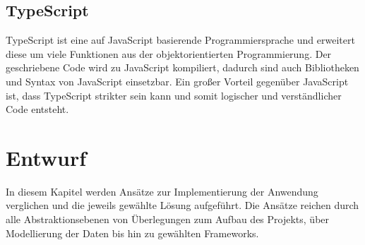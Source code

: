 \documentclass[12pt,twoside,a4paper]{article}
\begin{document}
\begin{sloppypar}
\subsection{TypeScript}\label{sec:typescript}
TypeScript ist eine auf JavaScript basierende Programmiersprache und erweitert diese um viele Funktionen aus der objektorientierten Programmierung. Der geschriebene Code wird zu JavaScript kompiliert, dadurch sind auch Bibliotheken und Syntax von JavaScript einsetzbar. Ein großer Vorteil gegenüber JavaScript ist, dass TypeScript strikter sein kann und somit logischer und verständlicher Code entsteht. \cite{ts-vs-js}
\newpage
\section{Entwurf}
In diesem Kapitel werden Ansätze zur Implementierung der Anwendung verglichen und die jeweils gewählte Lösung aufgeführt. Die Ansätze reichen durch alle Abstraktionsebenen von Überlegungen zum Aufbau des Projekts, über Modellierung der Daten bis hin zu gewählten Frameworks.

\end{sloppypar}
\end{document}
